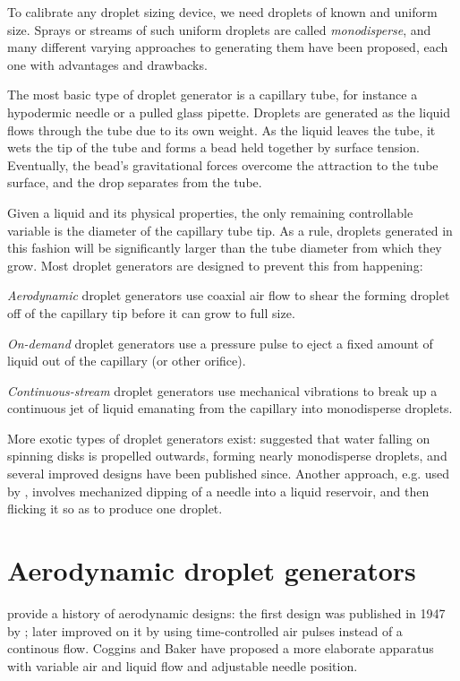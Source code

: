 \documentclass[11.5pt]{book}
\begin{document}
To calibrate any droplet sizing device, we need droplets of known and uniform
size. Sprays or streams of such uniform droplets are called \emph{monodisperse},
and many different varying approaches to generating them have been proposed,
each one with advantages and drawbacks.

The most basic type of droplet generator is a capillary tube, for instance a
hypodermic needle or a pulled glass pipette. Droplets are generated as the
liquid flows through the tube due to its own weight. As the liquid leaves the
tube, it wets the tip of the tube and forms a bead held together by surface
tension. Eventually, the bead's gravitational forces overcome the attraction to
the tube surface, and the drop separates from the tube.

Given a liquid and its physical properties, the only remaining controllable
variable is the diameter of the capillary tube tip. As a rule, droplets
generated in this fashion will be significantly larger than the tube diameter
from which they grow. Most droplet generators are designed to prevent this from
happening:
\begin{alist}
\item \emph{Aerodynamic} droplet generators use coaxial air flow to shear the
    forming droplet off of the capillary tip before it can grow to full size.
\item \emph{On-demand} droplet generators use a pressure pulse to eject a fixed
    amount of liquid out of the capillary (or other orifice).
\item \emph{Continuous-stream} droplet generators use mechanical vibrations to
    break up a continuous jet of liquid emanating from the capillary into
    monodisperse droplets.
\end{alist}
More exotic types of droplet generators exist: \citet{Walton49} suggested that
water falling on spinning disks is propelled outwards, forming nearly
monodisperse droplets, and several improved designs have been published since.
Another approach, e.g. used by \citet{Merritt77}, involves mechanized dipping of
a needle into a liquid reservoir, and then flicking it so as to produce one
droplet.

\section{Aerodynamic droplet generators}
\citet{Allan88} provide a history of aerodynamic designs: the first design was
published in 1947 by \citet{Lane47}; \citet{Reil69} later improved on it by
using time-controlled air pulses instead of a continous flow. Coggins and Baker
\cite{Coggins83} have proposed a more elaborate apparatus with variable air and liquid
flow and adjustable needle position.
\end{document}
